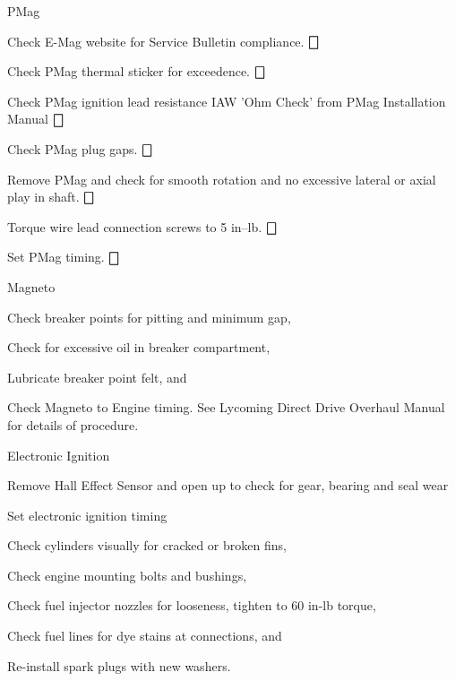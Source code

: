 \begin{enumerate*}
{	\item PMag
	\begin{enumerate*}
		\item Check E-Mag website for Service Bulletin compliance. \dotfill $\bigbox$
		\item Check PMag thermal sticker for exceedence. \dotfill $\bigbox$
		\item Check PMag ignition lead resistance IAW 'Ohm Check' from PMag Installation Manual  \dotfill $\bigbox$
		\item Check PMag plug gaps. \dotfill $\bigbox$
		\item Remove PMag and check for smooth rotation and no excessive lateral or axial play in shaft. \dotfill $\bigbox$
		\item Torque wire lead connection screws to 5 in--lb. \dotfill $\bigbox$
		\item Set PMag timing. \dotfill $\bigbox$
	\end{enumerate*}}
{	\item Magneto
	\begin{enumerate*}
		\item Check breaker points for pitting and minimum gap, 
		\item Check for excessive oil in breaker compartment, 
		\item Lubricate breaker point felt, and 
		\item Check Magneto to Engine timing. See Lycoming Direct Drive Overhaul Manual for details of procedure.
	\end{enumerate*}}
	\item Electronic Ignition
	  \begin{enumerate*}
	    \item Remove Hall Effect Sensor and open up to check for gear, bearing and seal wear
	    \item Set electronic ignition timing
    	\end{enumerate*} 	
	\item Check cylinders visually for cracked or broken fins, 
	\item Check engine mounting bolts and bushings, 
	\item Check fuel injector nozzles for looseness, tighten to 60 in-lb torque, 
	\item Check fuel lines for dye stains at connections, and 
	\item Re-install spark plugs with new washers. 
\end{enumerate*}

